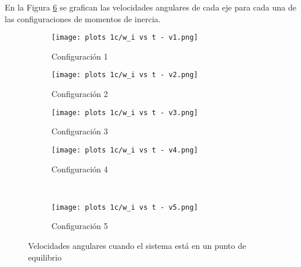 \documentclass[letterpaper, 12pt]{article}
\begin{document}
\begin{enumerate}
\begin{enumerate}
En la Figura \ref{fig:configuraciones de momentos de inercia} se grafican las velocidades angulares de cada eje para cada una de las configuraciones de momentos de inercia.

\begin{figure}[H]
    \centering
    \begin{subfigure}[H]{0.45\linewidth}
        \texttt{[image: plots 1c/w\_i vs t - v1.png]}
        \caption{\centering Configuración 1}
        \label{fig:config 1}
    \end{subfigure}
    \hspace{0.5cm}
    \begin{subfigure}[H]{0.45\linewidth}
        \texttt{[image: plots 1c/w\_i vs t - v2.png]}
        \caption{\centering Configuración 2}
        \label{fig:config 2}
    \end{subfigure}
    \newpage
    \begin{subfigure}[H]{0.45\linewidth}
        \texttt{[image: plots 1c/w\_i vs t - v3.png]}
        \caption{\centering Configuración 3}
        \label{fig:config 3}
    \end{subfigure}
    \hspace{0.5cm}
    \begin{subfigure}[H]{0.45\linewidth}
        \texttt{[image: plots 1c/w\_i vs t - v4.png]}
        \caption{\centering Configuración 4}
        \label{fig:config 4}
    \end{subfigure}
    \\
    \begin{subfigure}[H]{0.45\linewidth}
        \texttt{[image: plots 1c/w\_i vs t - v5.png]}
        \caption{\centering Configuración 5}
        \label{fig:config 5}
    \end{subfigure}
    \caption{Velocidades angulares cuando el sistema está en un punto de equilibrio}
    \label{fig:configuraciones de momentos de inercia}
\end{figure}


\end{enumerate}
\end{enumerate}
\end{document}
